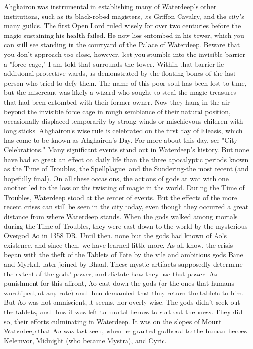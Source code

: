 \documentclass[10pt,a4paper,twoside,twocolumn,openany,nodeprecatedcode]{dndbook}
\begin{document}
Ahghairon was instrumental in establishing many of Waterdeep's other institutions, such as its black-robed magisters, its Griffon Cavalry, and the city's many guilds. The first Open Lord ruled wisely for over two centuries before the magic sustaining his health failed. He now lies entombed in his tower, which you can still see standing in the courtyard of the Palace of Waterdeep. Beware that you don't approach too close, however, lest you stumble into the invisible barrier-a "force cage," I am told-that surrounds the tower.
Within that barrier lie additional protective wards, as demonstrated by the floating bones of the last person who tried to defy them. The name of this poor soul has been lost to time, but the miscreant was likely a wizard who sought to steal the magic treasures that had been entombed with their former owner. Now they hang in the air beyond the invisible force cage in rough semblance of their natural position, occasionally displaced temporarily by strong winds or mischievous children with long sticks.
Ahghairon's wise rule is celebrated on the first day of Eleasis, which has come to be known as Ahghairon's Day. For more about this day, see "City Celebrations."
Many significant events stand out in Waterdeep's history. But none have had so great an effect on daily life than the three apocalyptic periods known as the Time of Troubles, the Spellplague, and the Sundering-the most recent (and hopefully final). On all these occasions, the actions of gods at war with one another led to the loss or the twisting of magic in the world. During the Time of Troubles, Waterdeep stood at the center of events. But the effects of the more recent crises can still be seen in the city today, even though they occurred a great distance from where Waterdeep stands.
When the gods walked among mortals during the Time of Troubles, they were cast down to the world by the mysterious Overgod Ao in 1358 DR. Until then, none but the gods had known of Ao's existence, and since then, we have learned little more. As all know, the crisis began with the theft of the Tablets of Fate by the vile and ambitious gods Bane and Myrkul, later joined by Bhaal. These mystic artifacts supposedly determine the extent of the gods' power, and dictate how they use that power. As punishment for this affront, Ao cast down the gods (or the ones that humans worshiped, at any rate) and then demanded that they return the tablets to him.
But Ao was not omniscient, it seems, nor overly wise. The gods didn't seek out the tablets, and thus it was left to mortal heroes to sort out the mess. They did so, their efforts culminating in Waterdeep. It was on the slopes of Mount Waterdeep that Ao was last seen, when he granted godhood to the human heroes Kelemvor, Midnight (who became Mystra), and Cyric.
\end{document}
